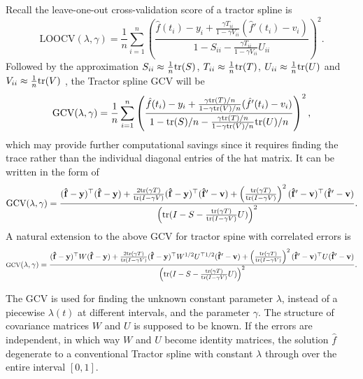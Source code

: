 Recall the leave-one-out cross-validation score of a tractor spline is 
\begin{equation*}
\mbox{LOOCV}(\lambda,\gamma)=\frac{1}{n}\sum_{i=1}^{n}\left( \frac{\hat{f}(t_i)-y_i+\frac{\gamma T_{ii}}{1-\gamma V_{ii}}(\hat{f}'(t_i)-v_i)}{1-S_{ii}-\frac{\gamma T_{ii}}{1-\gamma V_{ii}}U_{ii}} \right)^2.
\end{equation*}
Followed by the approximation $S_{ii}\approx\frac{1}{n}\mathrm{tr}(S)$, $T_{ii}\approx\frac{1}{n}\mathrm{tr}(T)$, $U_{ii}\approx\frac{1}{n}\mathrm{tr}(U)$ and $V_{ii}\approx\frac{1}{n}\mathrm{tr}(V)$ \cite{syed2011review}, the Tractor spline GCV will be 
\begin{equation*}
\mbox{GCV}(\lambda,\gamma)=\frac{1}{n}\sum_{i=1}^{n}\left( \frac{\hat{f}(t_i)-y_i+ \frac{\gamma\mathrm{tr}(T)/n}{1-\gamma \mathrm{tr}(V)/n}(\hat{f}'(t_i)-v_i)}{1-\mathrm{tr}(S)/n-\frac{\gamma\mathrm{tr}(T)/n}{1-\gamma \mathrm{tr}(V)/n} \mathrm{tr}(U)/n} \right)^2,
\end{equation*}
which may provide further computational savings since it requires finding the trace rather than the individual diagonal entries of the hat matrix. It can be written in the form of
\begin{equation*}
\mbox{GCV}(\lambda,\gamma)=\frac{(\mathbf{\hat{f}}-\mathbf{y})^\top (\mathbf{\hat{f}}-\mathbf{y})+\frac{2\mathrm{tr}(\gamma T)}{\mathrm{tr}(I-\gamma V)}(\mathbf{\hat{f}}-\mathbf{y})^\top (\mathbf{\hat{f}}'-\mathbf{v}) + \left( \frac{\mathrm{tr}(\gamma T)}{\mathrm{tr}(I-\gamma V)} \right)^2 (\mathbf{\hat{f}}'-\mathbf{v})^\top (\mathbf{\hat{f}}'-\mathbf{v})}{\left( \mathrm{tr}(I-S-\frac{\mathrm{tr}(\gamma T)}{\mathrm{tr}(I-\gamma V)}U) \right)^2}.
\end{equation*}
A natural extension to the above GCV for tractor spine with correlated errors is
\begin{equation}
\footnotesize
\mbox{GCV}(\lambda,\gamma)=\frac{(\mathbf{\hat{f}}-\mathbf{y})^\top W(\mathbf{\hat{f}}-\mathbf{y})+\frac{2\mathrm{tr}(\gamma T)}{\mathrm{tr}(I-\gamma V)}(\mathbf{\hat{f}}-\mathbf{y})^\top W^{1/2}U^{\top 1/2}(\mathbf{\hat{f}}'-\mathbf{v}) + \left( \frac{\mathrm{tr}(\gamma T)}{\mathrm{tr}(I-\gamma V)} \right)^2 (\mathbf{\hat{f}}'-\mathbf{v})^\top U(\mathbf{\hat{f}}'-\mathbf{v})}{\left( \mathrm{tr}(I-S-\frac{\mathrm{tr}(\gamma T)}{\mathrm{tr}(I-\gamma V)}U) \right)^2}.
\end{equation}
\normalsize


The GCV is used for finding the unknown constant parameter $\lambda$, instead of a piecewise $\lambda(t)$ at different intervals, and the parameter $\gamma$. The structure of covariance matrices $W$ and $U$ is supposed to be known. If the errors are independent, in which way $W$ and $U$ become identity matrices, the solution $\hat{f}$ degenerate to a conventional Tractor spline with constant $\lambda$ through over the entire interval $[0,1]$.  



